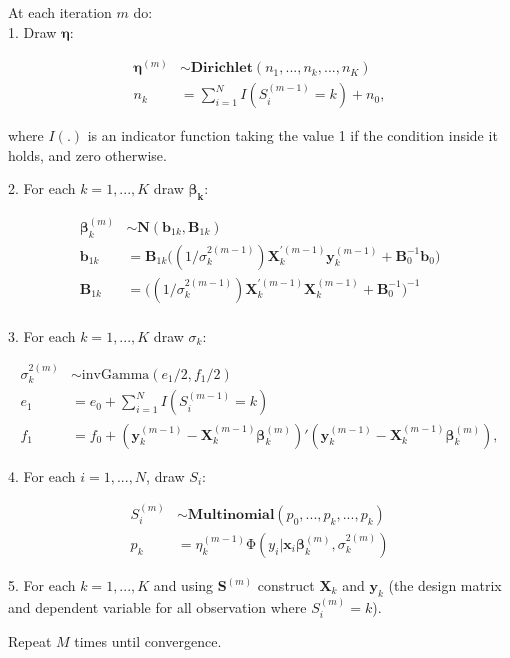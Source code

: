 \documentclass[11pt,a4paper]{article}
\begin{document}
\begin{shadedbox}
At each iteration $m$ do:  \\
1. Draw $\mathbf{\eta}$: 

\begin{equation*}
\begin{split}
\bm{\eta}^{(m)} &\sim \mathrm{\mathbf{Dirichlet}}(n_1,..., n_k ,...,n_K) \\
n_k &= \sum_{i=1}^{N} I(S^{(m-1)}_i = k) + n_0, 
\end{split}
\end{equation*}

where $I(.)$ is an indicator function taking the value 1 if the condition inside it holds, and zero otherwise. 

2. For each $k=1,...,K$ draw $\mathbf{\beta_k}$: 

\begin{equation*}
\begin{split}
\boldsymbol{\beta}^{(m)}_k &\sim \mathrm{\mathbf{N}}(\textbf{b}_{1k}, \textbf{B}_{1k}) \\
\textbf{b}_{1k} &= \textbf{B}_{1k} \bigg ( ( 1/\sigma^{2(m-1)}_{k} ) \textbf{X}^{'(m-1)}_k\textbf{y}^{(m-1)}_k + \textbf{B}_0^{-1} \textbf{b}_0  \bigg ) \\
\textbf{B}_{1k} &= \bigg ( ( 1/\sigma^{2(m-1)}_k ) \textbf{X}^{'(m-1)}_k \textbf{X}^{(m-1)}_k + \textbf{B}_0^{-1} \bigg )^{-1} \\
\end{split}
\end{equation*}

3. For each $k=1,...,K$ draw $\sigma_k$: 

\begin{equation*}
\begin{split}
\sigma^{2(m)}_k &\sim \mathrm{invGamma}(e_1/2, f_1/2) \\
e_1 &= e_0 + \sum_{i=1}^{N} I(S^{(m-1)}_i = k)  \\
f_1 &= f_0 + (\textbf{y}^{(m-1)}_k - \textbf{X}^{(m-1)}_k \boldsymbol{\beta}^{(m)}_k)'(\textbf{y}^{(m-1)}_k - \textbf{X}^{(m-1)}_k \boldsymbol{\beta}^{(m)}_k), 
\end{split}
\end{equation*}

4. For each $i=1,...,N$, draw $S_i$: 

\begin{equation*}
\begin{split}
	S_i^{(m)} &\sim \mathrm{\mathbf{Multinomial}}(p_0,...,p_k,...,p_k) \\
	p_k &= \eta_k^{(m-1)} \mathrm{\Phi} ( y_{i} | \mathbf{x}_i \boldsymbol{\beta}_k^{(m)}, \sigma_k^{2(m)} )
\end{split}
\end{equation*}

5. For each $k=1,...,K$ and using $\mathbf{S}^{(m)}$ construct $\mathbf{X}_k$ and $\mathbf{y}_k$ (the design matrix and dependent variable for all observation where $S_i^{(m)}=k$). 

Repeat $M$ times until convergence. 
\end{shadedbox}
\end{document}
